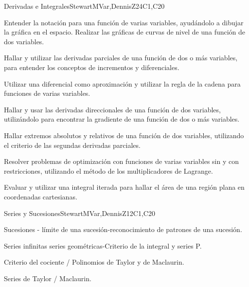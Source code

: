 \begin{syllabus}
\begin{unit}{Derivadas e Integrales}{}{StewartMVar,DennisZ}{24}{C1,C20}
  \begin{learningoutcomes}
   \item Entender la notación para una función de varias variables, ayudándolo a dibujar la gráfica en el espacio. Realizar las gráficas de curvas de nivel de una función de dos variables.
   \item Hallar y utilizar las derivadas parciales de una función de dos o más variables, para entender los conceptos de incrementos y diferenciales.
   \item Utilizar una diferencial como aproximación y utilizar la regla de la cadena para funciones de varias variables.
   \item Hallar y usar las derivadas direccionales de una función de dos variables, utilizándolo para encontrar la gradiente de una función de dos o más variables.
   \item Hallar extremos absolutos y relativos de una función de dos variables, utilizando el criterio de las segundas derivadas parciales.
   \item Resolver problemas de optimización con funciones de varias variables sin y con restricciones, utilizando el método de los multiplicadores de Lagrange.
   \item Evaluar y utilizar una integral iterada para hallar el área de una región plana en coordenadas cartesianas.
  \end{learningoutcomes}
\end{unit}

\begin{unit}{Series y Sucesiones}{}{StewartMVar,DennisZ}{12}{C1,C20}
  \begin{topics}
    \item Sucesiones - límite de una sucesión-reconocimiento de patrones de una sucesión.
    \item Series infinitas series geométricas-Criterio de la integral y series P.
    \item Criterio del cociente / Polinomios de Taylor y de Maclaurin.
    \item Series de Taylor / Maclaurin.
   \end{topics}
  

\end{unit}
\end{syllabus}
